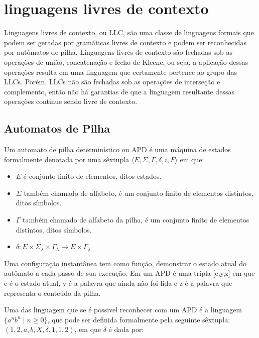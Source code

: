 \section{linguagens livres de contexto}

Linguagens livres de contexto, ou LLC, são uma classe de linguagens formais que podem ser geradas por gramáticas livres de contexto e podem ser reconhecidas por autômatos de pilha. Linguagens livres de contexto são fechadas sob as operações de união, concatenação e fecho de Kleene, ou seja, a aplicação dessas operações resulta em uma linguagem que certamente pertence ao grupo das LLCs. Porém, LLCs não são fechadas sob as operações de interseção e complemento, então não há garantias de que a linguagem resultante dessas operações continue sendo livre de contexto.

\subsection{Automatos de Pilha}

Um automato de pilha determinístico ou APD é uma máquina de estados formalmente denotada por uma sêxtupla 
$\langle E,\Sigma, \Gamma, \delta,i,F\rangle$ em que:

\begin{itemize}
     \item $E$ é conjunto finito de elementos, ditos estados. 
     \item $\Sigma$ também chamado de alfabeto, é um conjunto finito de elementos distintos, ditos símbolos.  
     \item $\Gamma$ também chamado de alfabeto da pilha, é um conjunto finito de elementos distintos, ditos símbolos.
     \item  $\delta : E \times \Sigma_\lambda \times \Gamma_\lambda \to E \times \Gamma_\lambda  $               
     
\end{itemize}

Uma configuração instantânea tem como função, demonstrar o estado atual do autômato a cada passo de sua execução. Em um APD é uma tripla [e,y,z] em que e é o estado atual, y é a palavra que ainda não foi lida e z é a palavra que representa o conteúdo da pilha.

Uma das linguagem que se é possivel reconhecer com um APD é a linguagem $\{a^n b^n \mid n \geq 0\}$, que pode ser definida formalmente pela seguinte sêxtupla: $({1,2},{a,b},{X},\delta,1,{1,2})$, em que $\delta$ é dada por: 

